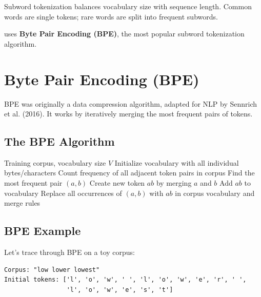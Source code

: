 \begin{keypoint}
Subword tokenization balances vocabulary size with sequence length. Common words are single tokens; rare words are split into frequent subwords.
\end{keypoint}

\TryLM uses \textbf{Byte Pair Encoding (BPE)}, the most popular subword tokenization algorithm.

\section{Byte Pair Encoding (BPE)}

BPE was originally a data compression algorithm, adapted for NLP by Sennrich et al. (2016). It works by iteratively merging the most frequent pairs of tokens.

\subsection{The BPE Algorithm}

\begin{algorithm}[H]
\caption{Byte Pair Encoding Training}
\begin{algorithmic}[1]
\Require Training corpus, vocabulary size $V$
\State Initialize vocabulary with all individual bytes/characters
    \State Count frequency of all adjacent token pairs in corpus
    \State Find the most frequent pair $(a, b)$
    \State Create new token $ab$ by merging $a$ and $b$
    \State Add $ab$ to vocabulary
    \State Replace all occurrences of $(a, b)$ with $ab$ in corpus
\EndWhile
\State \Return vocabulary and merge rules
\end{algorithmic}
\end{algorithm}

\subsection{BPE Example}

Let's trace through BPE on a toy corpus:

\begin{lstlisting}[style=shell, numbers=none]
Corpus: "low lower lowest"
Initial tokens: ['l', 'o', 'w', ' ', 'l', 'o', 'w', 'e', 'r', ' ',
                 'l', 'o', 'w', 'e', 's', 't']
\end{lstlisting}

